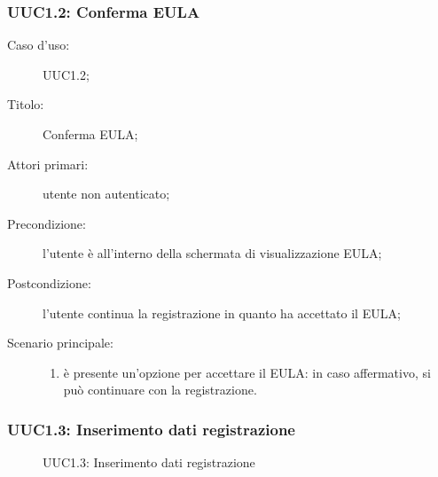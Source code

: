 \documentclass[../../../analisi-dei-requisiti.tex]{subfiles}
\begin{document}
\subsubsection{UUC1.2: Conferma EULA}%
\label{subs:UUC1.2}
\begin{description}
  \item[Caso d’uso:] UUC1.2;
  \item[Titolo:] Conferma EULA\@;
  \item[Attori primari:] utente non autenticato;
  \item[Precondizione:] l'utente è all'interno della schermata di visualizzazione EULA\@;
  \item[Postcondizione:] l'utente continua la registrazione in quanto ha accettato il EULA\@;
  \item[Scenario principale:]
        \begin{enumerate}
          \item è presente un'opzione per accettare il EULA\@: in caso affermativo, si può continuare con la registrazione.
        \end{enumerate}
\end{description}

\subsubsection{UUC1.3: Inserimento dati registrazione}%
\label{subs:UUC1.3}

\begin{figure}[H]
  \centering
  \caption{UUC1.3: Inserimento dati registrazione}%
  \label{fig:uuc1_3}
\end{figure}
\end{document}
